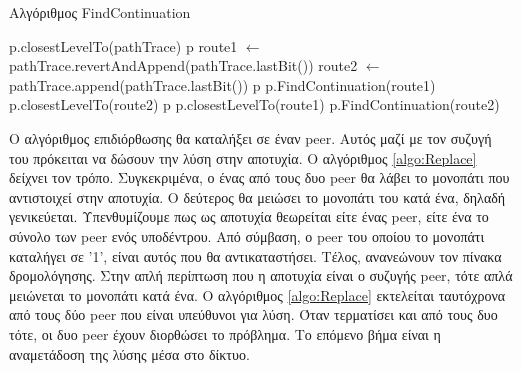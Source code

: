 \begin{algorithm}
\caption{Αλγόριθμος FindContinuation}
\label{algo:Continuation}
\begin{algorithmic}[1]
         \label{code:Check1}
            \State \Return p.closestLevelTo(pathTrace)
        \EndIf
         \label{code:Check2}
            \State \Return p
        \EndIf
        \State route1 $\gets$ pathTrace.revertAndAppend(pathTrace.lastBit())
        \State route2 $\gets$ pathTrace.append(pathTrace.lastBit())
                    \State \Return p
                \Else
                    \State \Return p.FindContinuation(route1)
                \EndIf
            \Else
                \State \Return p.closestLevelTo(route2)
            \EndIf
        \Else
                    \State \Return p
                \Else
                    \State \Return p.closestLevelTo(route1)
                \EndIf
            \Else
                \State \Return p.FindContinuation(route2)
            \EndIf
        \EndIf

    \EndProcedure
\end{algorithmic}
\end{algorithm}

Ο αλγόριθμος επιδιόρθωσης θα καταλήξει σε έναν peer. Αυτός μαζί με τον 
συζυγή του πρόκειται να δώσουν την λύση στην αποτυχία. Ο αλγόριθμος 
\ref{algo:Replace} δείχνει τον τρόπο. Συγκεκριμένα, ο ένας από τους δυο 
peer θα λάβει το μονοπάτι που αντιστοιχεί στην αποτυχία. Ο δεύτερος θα 
μειώσει το μονοπάτι του κατά ένα, δηλαδή γενικεύεται. Υπενθυμίζουμε πως 
ως αποτυχία θεωρείται είτε ένας peer, είτε ένα το σύνολο των peer ενός 
υποδέντρου. Από σύμβαση, ο peer του οποίου το μονοπάτι καταλήγει σε '1', 
είναι αυτός που θα αντικαταστήσει. Τέλος, ανανεώνουν τον πίνακα 
δρομολόγησης. Στην απλή περίπτωση που η αποτυχία 
είναι ο συζυγής peer, τότε απλά μειώνεται το μονοπάτι κατά ένα. 
Ο αλγόριθμος \ref{algo:Replace} εκτελείται ταυτόχρονα από τους δύο peer 
που είναι υπεύθυνοι για λύση. Όταν τερματίσει και από τους δυο τότε, οι 
δυο peer έχουν διορθώσει το πρόβλημα. Το επόμενο βήμα είναι η αναμετάδοση 
της λύσης μέσα στο δίκτυο.

